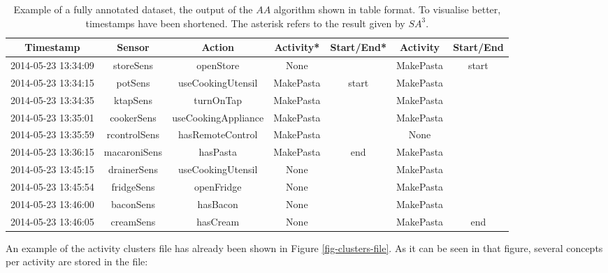 \begin{table}[htbp]\scriptsize
  \begin{center}
        \begin{tabular}{ccccccc}
            \hline            
            Timestamp & Sensor & Action & Activity* & Start/End* & Activity & Start/End \\             
            \hline
            2014-05-23 13:34:09 & storeSens & openStore & None &  & MakePasta & start \\
2014-05-23 13:34:15 & potSens & useCookingUtensil & MakePasta & start & MakePasta &  \\
2014-05-23 13:34:35 & ktapSens & turnOnTap & MakePasta &  & MakePasta &  \\
2014-05-23 13:35:01 & cookerSens & useCookingAppliance & MakePasta &  & MakePasta &  \\
2014-05-23 13:35:59 & rcontrolSens & hasRemoteControl & MakePasta &  & None &  \\
2014-05-23 13:36:15 & macaroniSens & hasPasta & MakePasta & end & MakePasta &  \\
2014-05-23 13:45:15 & drainerSens & useCookingUtensil & None &  & MakePasta &  \\
2014-05-23 13:45:54 & fridgeSens & openFridge & None &  & MakePasta &  \\
2014-05-23 13:46:00 & baconSens & hasBacon & None &  & MakePasta &  \\
2014-05-23 13:46:05 & creamSens & hasCream & None &  & MakePasta & end \\
            \hline
        \end{tabular}                
        \caption{Example of a fully annotated dataset, the output of the $AA$ algorithm shown in table format. To visualise better, timestamps have been shortened. The asterisk refers to the result given by $SA^3$.}
        \label{tab-fully-annotated}
    \end{center}
\end{table}

An example of the activity clusters file has already been shown in Figure \ref{fig-clusters-file}. As it can be seen in that figure, several concepts per activity are stored in the file:

